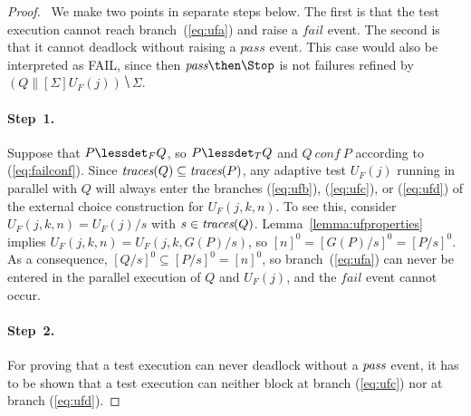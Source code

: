 \begin{proof}{~}We make two points in separate steps below. The
first is that the test execution cannot reach branch~(\ref{eq:ufa}) and raise
a $fail$ event.  The second is that it cannot deadlock without raising a
$pass$ event. This case would also be interpreted as FAIL, since then
$\epass\then\Stop$ is not failures refined by $(Q\parallel[\Sigma]
U_F(j))\hide \Sigma$.

\paragraph{Step~1.} Suppose that $P\lessdet_F Q$, so $P\lessdet_T Q$ and $Q\
conf\ P$ according to (\ref{eq:failconf}). Since   $\text{\it traces}(Q)\subseteq
\text{\it traces}(P)$, any adaptive test $U_F(j)$ running in parallel with $Q$ will always
enter the branches (\ref{eq:ufb}), (\ref{eq:ufc}), or (\ref{eq:ufd}) of the
external choice construction for $U_F(j,k,n)$. To see this, consider
 $U_F(j,k,n) = U_F(j)/s$
with $s\in\text{\it traces}(Q)$. Lemma~\ref{lemma:ufproperties} implies $U_F(j,k,n) =
U_F(j,k,G(P)/s)$, so $[n]^0 = [G(P)/s]^0 = [P/s]^0$. As a consequence,
$[Q/s]^0\subseteq [P/s]^0 = [n]^0$, so branch~(\ref{eq:ufa}) can never be
entered in the parallel execution of $Q$ and $U_F(j)$, and the $fail$ event
cannot occur.

\paragraph{Step~2.} For proving that a test execution can never deadlock without a 
${\text{\it pass}}$ event, it has to be shown that a test execution can neither block
at branch (\ref{eq:ufc}) nor at branch (\ref{eq:ufd}).


\end{proof}
